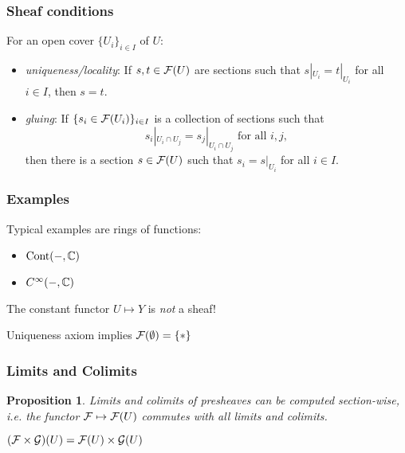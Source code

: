 \documentclass{beamer}
\newtheorem{proposition}{Proposition}
\DeclareMathOperator{\Cont}{Cont}
\begin{document}
\begin{frame}
    \frametitle{Sheaf conditions}

    For an open cover $\{U_i\}_{i\in I}$ of $U$:
    \begin{itemize}
        \item \emph{uniqueness/locality}: If $s,t\in \mathcal{F}(U)$ are sections such that
              $s|_{U_i} = t|_{U_i}$ for all $i\in I$, then $s=t$.
              \pause
        \item \emph{gluing}: If $\{s_i \in \mathcal{F}(U_i)\}_{i\in I}$ is
              a collection of sections such that
              \begin{equation*}
                  s_i|_{U_i \cap U_j} = s_j|_{U_i \cap U_j} \text { for all } i, j,
              \end{equation*}
              then there is a section $s\in \mathcal{F}(U)$ such that $s_i = s|_{U_i}$ for all $i \in I$.
    \end{itemize}

\end{frame}
\begin{frame}
    \frametitle{Examples}

    Typical examples are rings of functions:
    \begin{itemize}
        \item $\Cont(-, \bbC)$
        \item $C^\infty(-, \mathbb{C})$
    \end{itemize}
    \pause
    \medskip

    \medskip
    The constant functor $U \mapsto Y$ is \emph{not} a sheaf!

    Uniqueness axiom implies $\mathcal{F}(\emptyset) = \{*\}$
\end{frame}

\begin{frame}
    \frametitle{Limits and Colimits}

    \begin{proposition}
        Limits and colimits of presheaves can be computed
        section-wise, i.e. the functor $\mathcal{F} \mapsto \mathcal{F}(U)$
        commutes with all limits and colimits.
    \end{proposition}

    \pause
    \begin{example}
        $(\mathcal{F}\times \mathcal{G} )(U) = \mathcal{F}(U) \times \mathcal{G}(U)$
    \end{example}

\end{frame}
\end{document}
